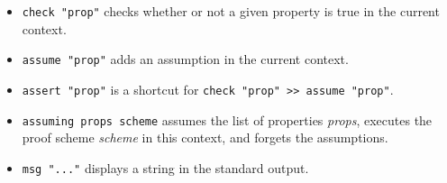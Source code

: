 \begin{itemize}
\itemsep1pt\parskip0pt
\item
  \texttt{check "prop"} checks whether or not a given property is true
  in the current context.
\item
  \texttt{assume "prop"} adds an assumption in the current context.
\item
  \texttt{assert "prop"} is a shortcut for
  \texttt{check "prop" \textgreater{}\textgreater{} assume "prop"}.
\item

\texttt{assuming props scheme} assumes the list of
  properties \emph{props}, executes the proof scheme \emph{scheme} in
  this context, and forgets the assumptions.

\item
  \texttt{msg "..."} displays a string in the standard output.
\end{itemize}

